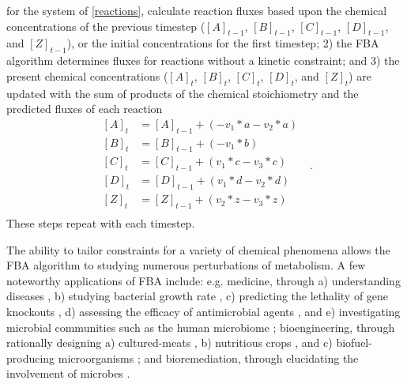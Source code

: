 for the system of \cref{reactions}, calculate reaction fluxes based upon the chemical concentrations of the previous timestep ($[A]_{t-1}$, $[B]_{t-1}$, $[C]_{t-1}$, $[D]_{t-1}$, and $[Z]_{t-1}$), or the initial concentrations for the first timestep; 2) the FBA algorithm determines fluxes for reactions without a kinetic constraint; and 3) the present chemical concentrations ($[A]_t$, $[B]_t$, $[C]_t$, $[D]_t$, and $[Z]_t$) are updated with the sum of products of the chemical stoichiometry and the predicted fluxes of each reaction 
\begin{equation} \label{concentrations}
    \begin{split}
        [A]_t &= [A]_{t-1} +(- v_1*a - v_2*a)\\
        [B]_t &= [B]_{t-1} +(- v_1*b)\\
        [C]_t &= [C]_{t-1} + (v_1*c - v_3*c)\\
        [D]_t &= [D]_{t-1} + (v_1*d - v_2*d)\\
        [Z]_t &= [Z]_{t-1} + (v_2*z - v_3*z)\\
    \end{split}~~~.
\end{equation}
These steps repeat with each timestep. 

The ability to tailor constraints for a variety of chemical phenomena allows the FBA algorithm to studying numerous perturbations of metabolism. A few noteworthy applications of FBA include: e.g. medicine, through a) understanding diseases \cite{Chowdhury2020LeveragingApplications}, b) studying bacterial growth rate \cite{Kauffman2003AdvancesAnalysis}, c) predicting the lethality of gene knockouts \cite{Covert2008IntegratingColi}, d) assessing the efficacy of antimicrobial agents \cite{Lee2006FluxMetabolomics}, and e) investigating microbial communities \cite{Zomorrodi2012OptCom:Communities, Khandelwal2013CommunityGrowth} such as the human microbiome \cite{Shoaie2015QuantifyingMicrobiome, Kumar2019ModellingMicrobiome}; bioengineering, through rationally designing a) cultured-meats \cite{Suthers2020ChallengesModeling}, b) nutritious crops \cite{Schwender2008MetabolicPlants, Allen2009MetabolicComplexity, Potrykus2001GoldenAward, Tang2009GoldenA}, and c) biofuel-producing microorganisms \cite{Pham2021Genome-scaleProduction}; and bioremediation, through elucidating the involvement of microbes \cite{Rubinstein2021ORTCodes}.

